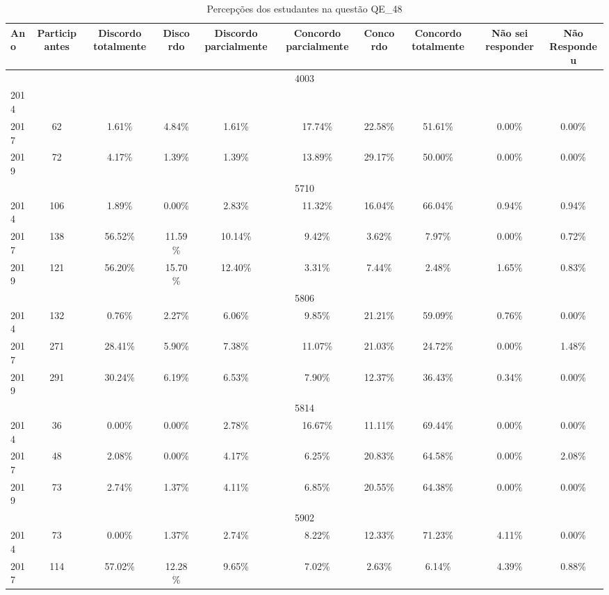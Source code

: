 \begin{table}[H]
\centering
\caption{Percepções dos estudantes na questão QE\_48}
\begin{tabular}{|l|c|ccc|ccc|cc|}
\hline
\toprule
Ano & Participantes & Discordo totalmente & Discordo & Discordo parcialmente & Concordo parcialmente & Concordo & Concordo totalmente & Não sei responder & Não Respondeu \\
\midrule
\hline
\multicolumn{10}{|c|}{4003}\\
\hline
2014 & & & & & & & & & \\
2017 & 62 & 1.61\% & 4.84\% & 1.61\% & 17.74\% & 22.58\% & 51.61\% & 0.00\% & 0.00\%\\
2019 & 72 & 4.17\% & 1.39\% & 1.39\% & 13.89\% & 29.17\% & 50.00\% & 0.00\% & 0.00\%\\
\hline
\hline
\multicolumn{10}{|c|}{5710}\\
\hline
2014 & 106 & 1.89\% & 0.00\% & 2.83\% & 11.32\% & 16.04\% & 66.04\% & 0.94\% & 0.94\%\\
2017 & 138 & 56.52\% & 11.59\% & 10.14\% & 9.42\% & 3.62\% & 7.97\% & 0.00\% & 0.72\%\\
2019 & 121 & 56.20\% & 15.70\% & 12.40\% & 3.31\% & 7.44\% & 2.48\% & 1.65\% & 0.83\%\\
\hline
\hline
\multicolumn{10}{|c|}{5806}\\
\hline
2014 & 132 & 0.76\% & 2.27\% & 6.06\% & 9.85\% & 21.21\% & 59.09\% & 0.76\% & 0.00\%\\
2017 & 271 & 28.41\% & 5.90\% & 7.38\% & 11.07\% & 21.03\% & 24.72\% & 0.00\% & 1.48\%\\
2019 & 291 & 30.24\% & 6.19\% & 6.53\% & 7.90\% & 12.37\% & 36.43\% & 0.34\% & 0.00\%\\
\hline
\hline
\multicolumn{10}{|c|}{5814}\\
\hline
2014 & 36 & 0.00\% & 0.00\% & 2.78\% & 16.67\% & 11.11\% & 69.44\% & 0.00\% & 0.00\%\\
2017 & 48 & 2.08\% & 0.00\% & 4.17\% & 6.25\% & 20.83\% & 64.58\% & 0.00\% & 2.08\%\\
2019 & 73 & 2.74\% & 1.37\% & 4.11\% & 6.85\% & 20.55\% & 64.38\% & 0.00\% & 0.00\%\\
\hline
\hline
\multicolumn{10}{|c|}{5902}\\
\hline
2014 & 73 & 0.00\% & 1.37\% & 2.74\% & 8.22\% & 12.33\% & 71.23\% & 4.11\% & 0.00\%\\
2017 & 114 & 57.02\% & 12.28\% & 9.65\% & 7.02\% & 2.63\% & 6.14\% & 4.39\% & 0.88\%\\

\end{tabular}
\end{table}
